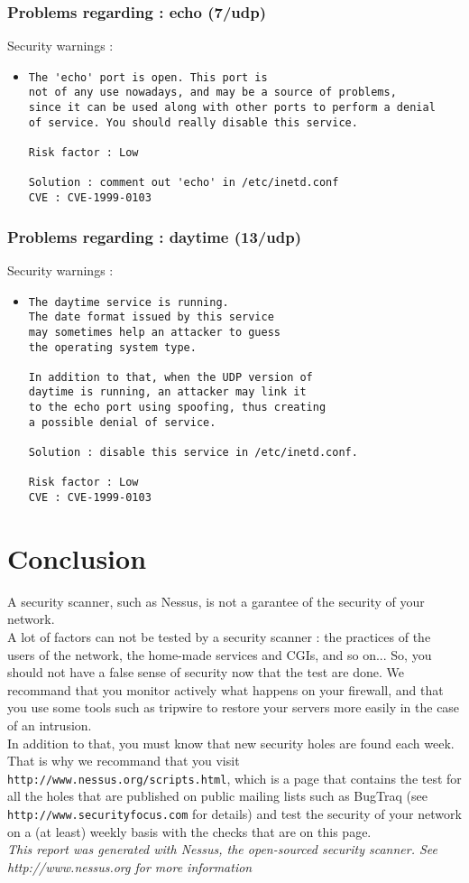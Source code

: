 \documentclass{article}
\begin{document}
\subsubsection{Problems regarding : echo (7/udp)}
Security warnings :\\
\begin{itemize}
\item \begin{verbatim}
The 'echo' port is open. This port is
not of any use nowadays, and may be a source of problems, 
since it can be used along with other ports to perform a denial
of service. You should really disable this service.

Risk factor : Low

Solution : comment out 'echo' in /etc/inetd.conf
CVE : CVE-1999-0103
\end{verbatim}\end{itemize}
\subsubsection{Problems regarding : daytime (13/udp)}
Security warnings :\\
\begin{itemize}
\item \begin{verbatim}
The daytime service is running.
The date format issued by this service
may sometimes help an attacker to guess
the operating system type. 

In addition to that, when the UDP version of
daytime is running, an attacker may link it 
to the echo port using spoofing, thus creating
a possible denial of service.

Solution : disable this service in /etc/inetd.conf.

Risk factor : Low
CVE : CVE-1999-0103
\end{verbatim}\end{itemize}
\newpage
\section*{Conclusion}
A security scanner, such as Nessus, is not a garantee  of the security of your network.\\
A lot of factors can not be tested by a security scanner : the practices of the users of the network, the home-made services and CGIs, and so on... So, you should not have a false sense of security now that the test are done. We recommand that you monitor actively what happens on your firewall, and that you use some tools such as tripwire to restore your servers more easily in the case of an intrusion.\\
In addition to that, you must know that new security holes are found each week. That is why we recommand that you visit \verb+http://www.nessus.org/scripts.html+, which is a page that contains the test for all the holes that are published on public mailing lists such as BugTraq (see \verb+http://www.securityfocus.com+ for details) and test the security of your network on a (at least) weekly basis with the checks that are on this page.\\
\textit{This report was generated with Nessus, the open-sourced security scanner. See http://www.nessus.org for more information}
\end{document}
